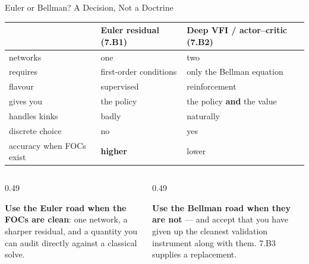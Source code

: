 \begin{frame}{Euler or Bellman? A Decision, Not a Doctrine}
\vspace{-1mm}
\begin{center}\footnotesize
\begin{tabularx}{\linewidth}{@{}>{\raggedright\arraybackslash}p{2.7cm} >{\raggedright\arraybackslash}X >{\raggedright\arraybackslash}X@{}}
\toprule
& \textbf{Euler residual (7.B1)} & \textbf{Deep VFI / actor--critic (7.B2)} \\
\midrule
networks & one & two \\
requires & first-order conditions & only the Bellman equation \\
flavour & supervised & reinforcement \\
gives you & the policy & the policy \textbf{and} the value \\
handles kinks & badly & naturally \\
discrete choice & no & yes \\
accuracy when FOCs exist & \textbf{higher} & lower \\
\bottomrule
\end{tabularx}
\end{center}
\medskip
\begin{columns}[T]
\begin{column}{0.49\textwidth}
\begin{takeawaybox}\footnotesize
\textbf{Use the Euler road when the FOCs are clean}: one network, a sharper residual, and a quantity you can audit directly against a classical solve.
\end{takeawaybox}
\end{column}
\begin{column}{0.49\textwidth}
\begin{cautionbox}\footnotesize
\textbf{Use the Bellman road when they are not} --- and accept that you have given up the cleanest validation instrument along with them. 7.B3 supplies a replacement.
\end{cautionbox}
\end{column}
\end{columns}
\vspace{1mm}
\end{frame}

